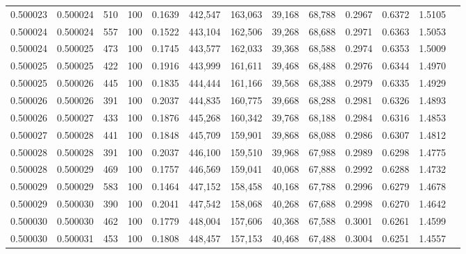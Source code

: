 \begin{tabular}{rrrrrrrrrrrrr}
0.500023 & 0.500024 &   510 & 100 &                                     0.1639 & 442,547 & 163,063 &  39,168 &  68,788 & 0.2967 & 0.6372 & 1.5105 \\
0.500024 & 0.500024 &   557 & 100 &                                     0.1522 & 443,104 & 162,506 &  39,268 &  68,688 & 0.2971 & 0.6363 & 1.5053 \\
0.500024 & 0.500025 &   473 & 100 &                                     0.1745 & 443,577 & 162,033 &  39,368 &  68,588 & 0.2974 & 0.6353 & 1.5009 \\
0.500025 & 0.500025 &   422 & 100 &                                     0.1916 & 443,999 & 161,611 &  39,468 &  68,488 & 0.2976 & 0.6344 & 1.4970 \\
0.500025 & 0.500026 &   445 & 100 &                                     0.1835 & 444,444 & 161,166 &  39,568 &  68,388 & 0.2979 & 0.6335 & 1.4929 \\
0.500026 & 0.500026 &   391 & 100 &                                     0.2037 & 444,835 & 160,775 &  39,668 &  68,288 & 0.2981 & 0.6326 & 1.4893 \\
0.500026 & 0.500027 &   433 & 100 &                                     0.1876 & 445,268 & 160,342 &  39,768 &  68,188 & 0.2984 & 0.6316 & 1.4853 \\
0.500027 & 0.500028 &   441 & 100 &                                     0.1848 & 445,709 & 159,901 &  39,868 &  68,088 & 0.2986 & 0.6307 & 1.4812 \\
0.500028 & 0.500028 &   391 & 100 &                                     0.2037 & 446,100 & 159,510 &  39,968 &  67,988 & 0.2989 & 0.6298 & 1.4775 \\
0.500028 & 0.500029 &   469 & 100 &                                     0.1757 & 446,569 & 159,041 &  40,068 &  67,888 & 0.2992 & 0.6288 & 1.4732 \\
0.500029 & 0.500029 &   583 & 100 &                                     0.1464 & 447,152 & 158,458 &  40,168 &  67,788 & 0.2996 & 0.6279 & 1.4678 \\
0.500029 & 0.500030 &   390 & 100 &                                     0.2041 & 447,542 & 158,068 &  40,268 &  67,688 & 0.2998 & 0.6270 & 1.4642 \\
0.500030 & 0.500030 &   462 & 100 &                                     0.1779 & 448,004 & 157,606 &  40,368 &  67,588 & 0.3001 & 0.6261 & 1.4599 \\
0.500030 & 0.500031 &   453 & 100 &                                     0.1808 & 448,457 & 157,153 &  40,468 &  67,488 & 0.3004 & 0.6251 & 1.4557 \\

\end{tabular}

